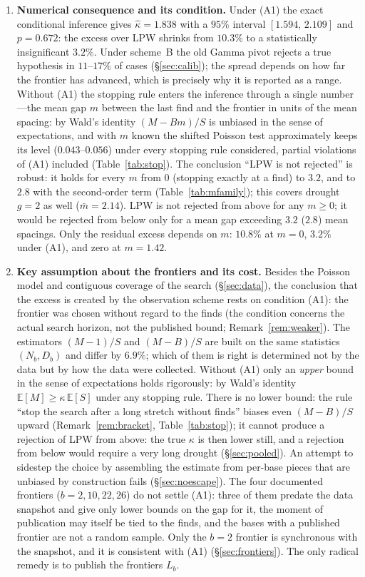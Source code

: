 \documentclass[11pt,a4paper]{article}
\theoremstyle{plain}
\theoremstyle{remark}
\begin{document}
\begin{enumerate}
\item\textbf{Numerical consequence and its condition.} Under (A1) the exact
conditional inference gives $\hat\kappa=1.838$ with a $95\%$ interval
$[1.594,\,2.109]$ and $p=0.672$: the excess over LPW shrinks from $10.3\%$ to a
statistically insignificant $3.2\%$. Under scheme~B the old Gamma pivot rejects a
true hypothesis in $11$--$17\%$ of cases (\S\ref{sec:calib}); the spread depends on
how far the frontier has advanced, which is precisely why it is reported as a
range. Without (A1) the stopping rule enters the inference through a single
number---the mean gap $m$ between the last find and the frontier in units of the
mean spacing: by Wald's identity $(M-Bm)/S$ is unbiased in the sense of
expectations, and with $m$ known the shifted Poisson test approximately keeps its
level ($0.043$--$0.056$) under every stopping rule considered, partial violations of
(A1) included (Table~\ref{tab:stop}). The conclusion ``LPW is not rejected'' is
robust: it holds for every $m$ from $0$ (stopping exactly at a find) to $3.2$, and
to $2.8$ with the second-order term (Table~\ref{tab:mfamily}); this covers drought
$g=2$ as well ($\bar m=2.14$). LPW is not rejected from above for any
$m\ge0$; it would be rejected from below only for a mean gap exceeding $3.2$
($2.8$) mean spacings. Only the residual
excess depends on $m$: $10.8\%$ at $m=0$, $3.2\%$ under (A1), and zero at
$m=1.42$.

\item\textbf{Key assumption about the frontiers and its cost.} Besides the
Poisson model and contiguous coverage of the search (\S\ref{sec:data}), the
conclusion that the excess is created by the observation scheme rests on
condition (A1): the frontier was chosen without regard to the finds (the
condition concerns the actual search horizon, not the published bound;
Remark~\ref{rem:weaker}). The estimators $(M-1)/S$ and
$(M-B)/S$ are built on the same statistics $(N_b,D_b)$ and differ by $6.9\%$;
which of them is right is determined not by the data but by how the data were
collected. Without (A1) only an \emph{upper} bound in the sense of expectations
holds rigorously: by Wald's identity $\mathbb E[M]\ge\kappa\,\mathbb E[S]$ under
any stopping rule. There is no lower bound: the rule ``stop the search after a
long stretch without finds'' biases even $(M-B)/S$ upward
(Remark~\ref{rem:bracket}, Table~\ref{tab:stop}); it cannot produce a rejection
of LPW from above: the true $\kappa$ is then lower still, and a rejection from below
would require a very long drought (\S\ref{sec:pooled}). An attempt to sidestep
the choice by assembling the estimate from per-base pieces that are unbiased by
construction fails (\S\ref{sec:noescape}). The four documented frontiers
($b=2,10,22,26$) do not settle (A1): three of them predate the data snapshot and
give only lower bounds on the gap for it, the moment of publication may itself be
tied to the finds, and the bases with a published frontier are not a random
sample. Only the $b=2$ frontier is synchronous with the snapshot, and it is
consistent with (A1) (\S\ref{sec:frontiers}). The only radical remedy is to
publish the frontiers $L_b$.


\end{enumerate}
\end{document}
